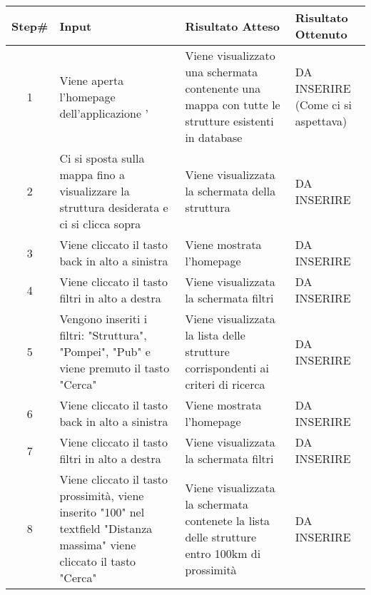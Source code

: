 \begin{table}[H]
    \footnotesize
    \begin{tabularx}{\textwidth}{|c|X|X|X|}
        \hline
        Step\# & Input & Risultato Atteso & Risultato Ottenuto \\
        \hline
         1 & Viene aperta l'homepage dell'applicazione '
         & Viene visualizzato una schermata contenente una mappa con tutte le strutture esistenti in database
         &DA INSERIRE (Come ci si aspettava)\\
          \hline
        2 & Ci si sposta sulla mappa fino a visualizzare la struttura desiderata e ci si clicca sopra
        & Viene visualizzata la schermata della struttura
        & DA INSERIRE\\
         \hline 
        3 & Viene cliccato il tasto back in alto a sinistra
         & Viene mostrata l'homepage & DA INSERIRE\\
          \hline
        4 & Viene cliccato il tasto filtri in alto a destra
         & Viene visualizzata la schermata filtri
         & DA INSERIRE\\
          \hline 
        5 & Vengono inseriti i filtri: "Struttura", "Pompei", "Pub" e viene premuto il tasto "Cerca"
         & Viene visualizzata la lista delle strutture corrispondenti ai criteri di ricerca
         & DA INSERIRE\\
          \hline 
        6 & Viene cliccato il tasto back in alto a sinistra
          & Viene mostrata l'homepage
          & DA INSERIRE\\
           \hline      
        7 & Viene cliccato il tasto filtri in alto a destra
        & Viene visualizzata la schermata filtri
        & DA INSERIRE\\
        \hline       
        
        8 & Viene cliccato il tasto prossimità, viene inserito "100" nel textfield "Distanza massima" viene cliccato il tasto "Cerca"
        & Viene visualizzata la schermata contenete la lista delle strutture entro 100km di prossimità
        & DA INSERIRE\\
        \hline 
        
    \end{tabularx}
\end{table}
    
       
